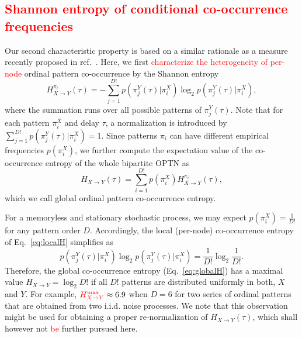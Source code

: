 \documentclass[12pt,aip,cha,reprint,nofootinbib]{revtex4-1}
\begin{document}
\textcolor{red}{\subsection{Shannon entropy of conditional co-occurrence frequencies}}
Our second characteristic property is based on a similar rationale as a measure recently proposed in ref.~\cite{McCullough2017b}. Here, we first \textcolor{red}{characterize the heterogeneity of per-node} ordinal pattern co-occurrence by the Shannon entropy
\begin{equation} \label{eq:localH}
H_{X \to Y}^{\pi_i}(\tau) = - \sum_{j=1}^{D!} p(\pi_{j}^{Y}(\tau) | \pi_i^{X}) \log_2 p(\pi_{j}^{Y}(\tau) | \pi_i^{X}), 
\end{equation}
where the summation runs over all possible patterns of $\pi_j^{Y}(\tau)$. Note that for each pattern $\pi_i^{X}$ and delay $\tau$, a normalization is introduced by $\sum_{j=1}^{D!} p(\pi_{j}^{Y}(\tau) | \pi_i^{X}) = 1$. Since patterns $\pi_i$ can have different empirical frequencies $p(\pi_i^{X})$, we further compute the expectation value of the co-occurrence entropy of the whole bipartite OPTN as 
\begin{equation}  \label{eq:globalH}
H_{X \to Y}(\tau) = \sum_{i=1}^{D!} p(\pi_i^{X}) H_{X \to Y}^{\pi_i}(\tau), 
\end{equation}
which we call global ordinal pattern co-occurrence entropy. 

For a memoryless and stationary stochastic process, we may expect $p(\pi_i^{X} )= \frac{1}{D!}$ for any pattern order $D$. Accordingly, the local (per-node) co-occurrence entropy of Eq.~\eqref{eq:localH} simplifies as 
\begin{equation}
p(\pi_{j}^{Y}(\tau) | \pi_i^{X}) \log_2 p(\pi_{j}^{Y}(\tau) | \pi_i^{X}) = \frac{1}{D!} \log_2 \frac{1}{D!}. 
\end{equation}
Therefore, the global co-occurrence entropy (Eq.~\eqref{eq:globalH}) has a maximal value $H_{X \to Y} = \log_2 D!$ if all $D!$ patterns are distributed uniformly in both, $X$ and $Y$. For example, ${\color{red}H_{X \to Y}^{\text{max}}} \approx 6.9$ when $D = 6$ for two series of ordinal patterns that are obtained from two i.i.d. noise processes. We note that this observation might be used for obtaining a proper re-normalization of $H_{X \to Y}(\tau)$, which shall however not \textcolor{red}{be} further pursued here.
\end{document}
